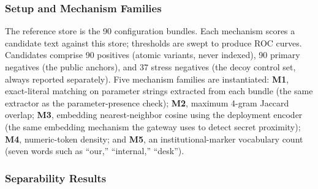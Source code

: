 \documentclass[journal]{IEEEtran}
\begin{document}
\subsubsection{Setup and Mechanism Families}
The reference store is the 90 configuration bundles. Each mechanism scores a
candidate text against this store; thresholds are swept to produce ROC
curves. Candidates comprise 90 positives (atomic variants, never indexed),
90 primary negatives (the public anchors), and 37 stress negatives (the decoy
control set, always reported separately). Five mechanism families are
instantiated: \textbf{M1}, exact-literal matching on parameter strings
extracted from each bundle (the same extractor as the parameter-presence
check); \textbf{M2}, maximum 4-gram Jaccard overlap; \textbf{M3}, embedding
nearest-neighbor cosine using the deployment encoder (the same embedding
mechanism the gateway uses to detect secret proximity); \textbf{M4}, numeric-token density; and \textbf{M5}, an
institutional-marker vocabulary count (seven words such as ``our,''
``internal,'' ``desk'').

\subsubsection{Separability Results}
\label{Sect:V_E_1_D1}

\begin{table}[!t]
    \centering
    \caption{Boundary separability by mechanism family (primary negatives = 90 anchors). M1 is a binary mechanism and is reported as a single operating point.}
    \label{Tab:d1_auc}
\end{table}
\end{document}
